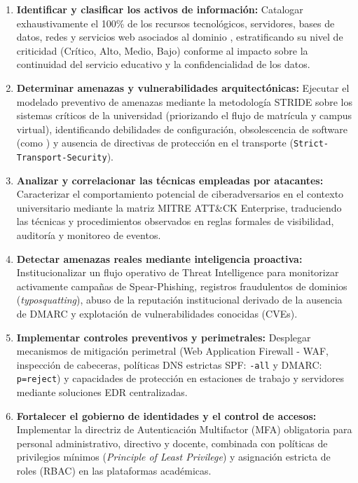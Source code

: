 \begin{enumerate}[itemsep=2.5pt,topsep=2pt,parsep=0pt]
    \item \textbf{Identificar y clasificar los activos de información:} Catalogar exhaustivamente el 100\% de los recursos tecnológicos, servidores, bases de datos, redes y servicios web asociados al dominio , estratificando su nivel de criticidad (Crítico, Alto, Medio, Bajo) conforme al impacto sobre la continuidad del servicio educativo y la confidencialidad de los datos.

    \item \textbf{Determinar amenazas y vulnerabilidades arquitectónicas:} Ejecutar el modelado preventivo de amenazas mediante la metodología STRIDE sobre los sistemas críticos de la universidad (priorizando el flujo de matrícula y campus virtual), identificando debilidades de configuración, obsolescencia de software (como ) y ausencia de directivas de protección en el transporte (\texttt{Strict-\allowbreak Transport-\allowbreak Security}).

    \item \textbf{Analizar y correlacionar las técnicas empleadas por atacantes:} Caracterizar el comportamiento potencial de ciberadversarios en el contexto universitario mediante la matriz MITRE ATT\&CK Enterprise, traduciendo las técnicas y procedimientos observados en reglas formales de visibilidad, auditoría y monitoreo de eventos.

    \item \textbf{Detectar amenazas reales mediante inteligencia proactiva:} Institucionalizar un flujo operativo de Threat Intelligence para monitorizar activamente campañas de Spear-Phishing, registros fraudulentos de dominios (\textit{typosquatting}), abuso de la reputación institucional derivado de la ausencia de DMARC y explotación de vulnerabilidades conocidas (CVEs).

    \item \textbf{Implementar controles preventivos y perimetrales:} Desplegar mecanismos de mitigación perimetral (Web Application Firewall - WAF, inspección de cabeceras, políticas DNS estrictas SPF: \texttt{-all} y DMARC: \texttt{p=reject}) y capacidades de protección en estaciones de trabajo y servidores mediante soluciones EDR centralizadas.

    \item \textbf{Fortalecer el gobierno de identidades y el control de accesos:} Implementar la directriz de Autenticación Multifactor (MFA) obligatoria para personal administrativo, directivo y docente, combinada con políticas de privilegios mínimos (\textit{Principle of Least Privilege}) y asignación estricta de roles (RBAC) en las plataformas académicas.


\end{enumerate}
